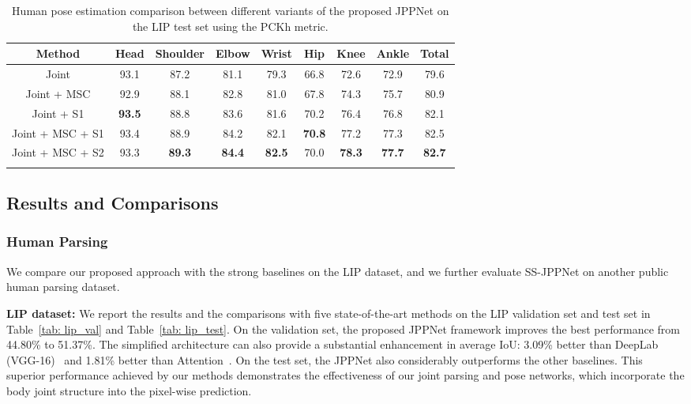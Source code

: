 \documentclass[10pt,journal,compsoc]{IEEEtran}
\begin{document}
\begin{table*}[t]
\centering
\normalsize
\vspace{-2mm}
\caption{Human pose estimation comparison between different variants of the proposed JPPNet on the LIP test set using the PCKh metric.}
\vspace{-3mm}
\label{tab: ablation_pose}
\begin{tabular}{ccccccccc}
\toprule[0.7pt]
   Method             & Head          & Shoulder & Elbow & Wrist & Hip   & Knee & Ankle & Total  \\ \hline 
   Joint              & 93.1          & 87.2     & 81.1  & 79.3  & 66.8  & 72.6 & 72.9  & 79.6   \\
   Joint + MSC        & 92.9          & 88.1     & 82.8  & 81.0  & 67.8  & 74.3 & 75.7  & 80.9   \\
   Joint + S1         & \textbf{93.5} & 88.8     & 83.6  & 81.6  & 70.2  & 76.4 & 76.8  & 82.1   \\
   Joint + MSC + S1   & 93.4 & 88.9   & 84.2     & 82.1  & \textbf{70.8} & 77.2 & 77.3  & 82.5   \\
   Joint + MSC + S2   & 93.3          & \textbf{89.3} & \textbf{84.4} & \textbf{82.5} & 70.0 & \textbf{78.3} & \textbf{77.7} & \textbf{82.7} \\
\toprule[0.7pt]
\vspace{-6mm}
\end{tabular}
\end{table*}


\subsection{Results and Comparisons}

\subsubsection{Human Parsing}
We compare our proposed approach with the strong baselines on the LIP dataset, and we further evaluate SS-JPPNet on another public human parsing dataset.

\textbf{LIP dataset:}
We report the results and the comparisons with five state-of-the-art methods on the LIP validation set and test set in Table~\ref{tab: lip_val} and Table~\ref{tab: lip_test}. On the validation set, the proposed JPPNet framework improves the best performance from 44.80\% to 51.37\%. The simplified architecture can also provide a substantial enhancement in average IoU: 3.09\% better than DeepLab (VGG-16)~\cite{chen2016deeplab} and 1.81\% better than Attention~\cite{chen2015attention}. On the test set, the JPPNet also considerably outperforms the other baselines. This superior performance achieved by our methods demonstrates the effectiveness of our joint parsing and pose networks, which incorporate the body joint structure into the pixel-wise prediction.
\end{document}
